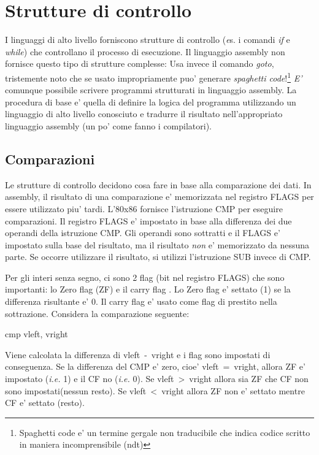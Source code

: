 \section{Strutture di controllo}
\label{sec:control}
I linguaggi di alto livello forniscono strutture di controllo (\emph es. i 
comandi \emph{if} e \emph{while}) che controllano il processo di 
esecuzione. Il linguaggio assembly non fornisce questo tipo di strutture
complesse: Usa invece il comando \emph{goto}, tristemente noto che se
usato impropriamente puo' generare \emph{spaghetti code}!\footnote{Spaghetti code
e' un termine gergale non traducibile che indica codice scritto in maniera
incomprensibile (ndt)} \emph{E'} comunque possibile scrivere programmi
strutturati in linguaggio assembly. La procedura di base e' quella di
definire la logica del programma utilizzando un linguaggio di alto livello
conosciuto e tradurre il risultato nell'appropriato linguaggio 
assembly (un po' come fanno i compilatori). 

\subsection{Comparazioni  }

Le strutture di controllo decidono cosa fare in base alla comparazione
dei dati. In assembly, il risultato di una comparazione e' memorizzata 
nel registro FLAGS per essere utilizzato piu' tardi. L'80x86 fornisce 
l'istruzione {\code CMP} per eseguire comparazioni. Il registro FLAGS
e' impostato in base alla differenza dei due operandi della istruzione
{\code CMP}. Gli operandi sono sottratti e il FLAGS e' impostato sulla
base del risultato, ma il risultato \emph{non} e' memorizzato da
nessuna parte. Se occorre utilizzare il risultato, si utilizzi 
l'istruzione {\code SUB} invece di {\code CMP}.

Per gli interi senza segno, ci sono 2 flag (bit nel registro FLAGS)
che sono importanti: lo Zero flag (ZF)  e il
carry flag . Lo Zero flag e' settato (1) se 
la differenza risultante e' 0. Il carry flag e' usato come flag di prestito
nella sottrazione. Considera la comparazione seguente:
\begin{AsmCodeListing}[frame=none, numbers=none]
      cmp    vleft, vright
\end{AsmCodeListing}
Viene calcolata la differenza di {\code vleft~-~vright} e i flag sono
impostati di conseguenza. Se la differenza del {\code CMP} e' zero, cioe'
{\code vleft~=~vright}, allora ZF e' impostato (\emph{i.e.} 1) e il CF 
no (\emph{i.e.} 0). Se {\code vleft~>~vright} allora sia ZF che CF non 
sono impostati(nessun  resto). Se {\code vleft~<~vright} allora ZF
non e' settato mentre CF e' settato (resto).

